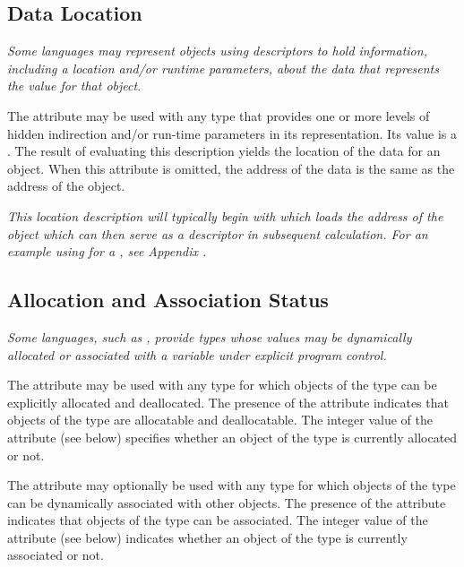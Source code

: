 \subsection{Data Location}
\label{chap:datalocation}

\textit{Some languages may represent objects using descriptors to hold
information, including a location and/or run\dash time parameters,
about the data that represents the value for that object.}

The\hypertarget{chap:DWATdatalocationindirectiontoactualdata}{}
\DWATdatalocationDEFN{} attribute
may be used with any type that provides one or more levels of
hidden indirection
and/or run-time parameters in its representation. Its value
is a .
The result of evaluating this
description yields the location of the data for an object.
When this attribute is omitted, the address of the data is
the same as the address of the object.

\textit{This location description will typically begin with
\DWOPpushobjectaddress{}
which loads the address of the
object which can then serve as a descriptor in subsequent
calculation. For an example using
\DWATdatalocation{}
for a , see
Appendix .}

\subsection{Allocation and Association Status}
\label{chap:allocationandassociationstatus}

\textit{Some languages, such as ,
provide types whose values
may be dynamically allocated or associated with a variable
under explicit program control.}

The\hypertarget{chap:DWATallocatedallocationstatusoftypes}{}
\DWATallocatedDEFN{} attribute
may be used with any
type for which objects of the type can be explicitly allocated
and deallocated. The presence of the attribute indicates that
objects of the type are allocatable and deallocatable. The
integer value of the attribute (see below) specifies whether
an object of the type is currently allocated or not.

The\hypertarget{chap:DWATassociatedassociationstatusoftypes}{}
\DWATassociatedDEFN{} attribute
may
optionally be used with
any type for which objects of the type can be dynamically
associated with other objects. The presence of the attribute
indicates that objects of the type can be associated. The
integer value of the attribute (see below) indicates whether
an object of the type is currently associated or not.

